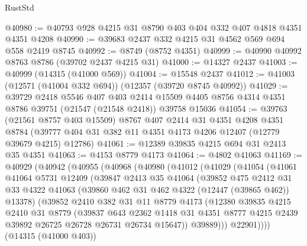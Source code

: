 \begin{lexlean}{RustStd}
\begin{coremodule}
@40980 := @40793 @928 @4215 @31 @8790 @403 @404 @332 @407 @4818 @4351 @4351 @4208
@40990 := @39683 @2437 @332 @4215 @31 @4562 @569 @694 @558 @2419 @8745
@40992 := @8749 (@8752 @4351)
@40999 := @40990 @40992 @8763 @8786 (@39702 @2437 @4215 @31)
@41000 := @14327 @2437
@41003 := @40999 (@14315 (@41000 @569))
@41004 := @15548 @2437
@41012 := @41003 (@12571 (@41004 @332 @694)) (@12357 (@39720 @8745 @40992))
@41029 := @39729
    @2418
    @5546
    @407
    @403
    @2414
    @15509
    @4405
    @8756
    @4314
    @4351
    @8786
    @39751
    (@21547 (@21548 @2418))
    @39758
    @15036
@41054 := @39763
    (@21561 @8757 @403 @15509)
    @8767
    @407
    @2414
    @31
    @4351
    @4208
    @4351
    @8784
    (@39777 @404 @31 @382 @11 @4351 @4173 @4206 @12407 (@12779 @39679 @4215) @12786)
@41061 := @12389 @39835 @4215 @694 @31 @2413 @35 @4351
@41063 := @4153 @8779 @4173
@41064 := @4802 @41063
@41169 := @40929
    (@40942
      (@40955
        (@40968
          (@40980
            (@41012
              (@41029
                (@41054
                  (@41061
                    @41064
                    @5731
                    @12409
                    (@39847
                      @2413
                      @35
                      @41064
                      (@39852
                        @475
                        @2412
                        @31
                        @33
                        @4322
                        @41063
                        (@39860 @462 @31 @462 @4322 (@12447 (@39865 @462)) @13378)
                        (@39852
                          @2410
                          @382
                          @31
                          @11
                          @8779
                          @4173
                          (@12380
                            @39835
                            @4215
                            @2410
                            @31
                            @8779
                            (@39837
                              @643
                              @2362
                              @1418
                              @31
                              @4351
                              @8777
                              @4215
                              @2439
                              @39892
                              @26725
                              @26728
                              @26731
                              @26734
                              @15647))
                          @39889)))
                    @22901))))
            (@14315 (@41000 @403))

\end{coremodule}
\end{lexlean}
